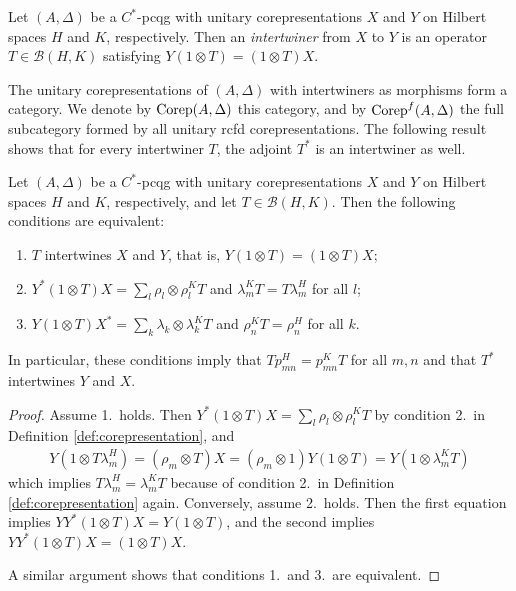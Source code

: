 \begin{Def} \label{def:intertwiner}
  Let $(A,\Delta)$ be a $C^{*}$-pcqg with unitary corepresentations $X$ and $Y$ on Hilbert spaces
  $H$ and $K$, respectively.  Then an \emph{intertwiner} from $X$ to $Y$ is an operator $T\in
  \mathcal{B}(H,K)$ satisfying   $Y(1\otimes T)=(1 \otimes T)X$.
\end{Def}
The unitary corepresentations of $(A,\Delta)$ with intertwiners as morphisms form a category.  We
denote by $\mathrm{Corep}(A,\Delta)$ this category, and by $\mathrm{Corep}^{f}(A,\Delta)$ the full subcategory formed
by all unitary rcfd corepresentations. The following result shows that for every intertwiner $T$,
the adjoint $T^{*}$ is an intertwiner as well.
\begin{Lem} \label{lem:def-intertwiner}
  Let $(A,\Delta)$ be a $C^{*}$-pcqg with unitary corepresentations $X$ and $Y$ on Hilbert spaces
  $H$ and $K$, respectively, and let $T\in \mathcal{B}(H,K)$. Then the following conditions are
  equivalent:
  \begin{enumerate}
  \item $T$ intertwines $X$ and $Y$, that is, $Y(1\otimes T)=(1 \otimes T)X$;
  \item $Y^{*}(1\otimes T)X=\sum_{l} \rho_{l} \otimes \rho^{K}_{l}T$ and $\lambda_{m}^{K}T=T\lambda_{m}^{H}$ for all $l$;
  \item $Y(1\otimes T)X^{*} = \sum_{k} \lambda_{k} \otimes \lambda^{K}_{k}T$ and
    $\rho_{n}^{K}T=\rho_{n}^{H}$ for all $k$.
  \end{enumerate}
  In particular,  these conditions imply that $Tp_{mn}^{H}=p_{mn}^{K}T$ for all $m,n$ and that
  $T^{*}$ intertwines $Y$ and $X$.
\end{Lem}
\begin{proof}
  Assume 1.\ holds. Then $Y^{*}(1\otimes T)X=\sum_{l} \rho_{l} \otimes \rho^{K}_{l}T$ by condition
  2.\ in Definition \ref{def:corepresentation}, and
  \begin{align*}
    Y(1\otimes T\lambda^{H}_{m}) = (\rho_{m} \otimes T)X = (\rho_{m} \otimes 1)Y(1\otimes T) =
    Y(1\otimes \lambda^{K}_{m}T)
  \end{align*}
which implies $T\lambda^{H}_{m} = \lambda^{K}_{m}T$ because of  condition
  2.\ in Definition \ref{def:corepresentation} again. 
Conversely, assume 2.\ holds. Then the first equation implies $YY^{*}(1\otimes T)X = Y(1\otimes T)$,
and the second implies $YY^{*}(1\otimes T)X=(1\otimes T)X$.

 A similar argument shows that conditions 1.\ and 3.\ are equivalent.
\end{proof}

